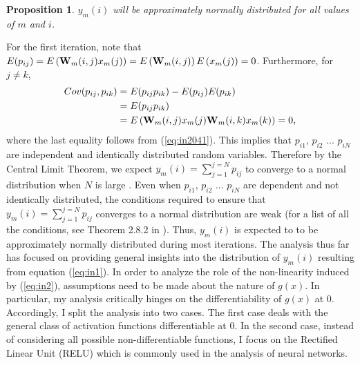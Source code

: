 \documentclass[a4paper]{article}
\newcommand{\eref}[1]{(\ref {eq:#1})}
\newcommand{\be}{\begin{equation}}
\newcommand{\ee}{\end{equation}}
\newtheorem{prop}{Proposition}
\begin{document}
\begin{prop}
$y_{m}(i)$ will be approximately normally distributed for all values of $m$ and $i$.
\end{prop}
\noindent
\noindent
For the first iteration, note that $E(p_{ij}) = E\left({\bf{W}}_{m}(i,j)x_{m}(j)\right) = E\left({\bf{W}}_{m}(i,j)\right)E\left(x_{m}(j)\right)  = 0$. Furthermore, for $j \neq k$,
\be 
\begin{split}
Cov(p_{ij},p_{ik})&= E(p_{ij}p_{ik}) - E(p_{ij})E(p_{ik}) \\
&=  E(p_{ij}p_{ik}) \\
&= E\left({\bf{W}}_{m}(i,j)x_{m}(j){\bf{W}}_{m}(i,k)x_{m}(k)\right) = 0,\\ 
\end{split}
\ee
where the last equality follows from \eref{in2041}. This implies that $p_{i1}$, $p_{i2}$ ... $p_{iN}$ are independent and identically distributed random variables. Therefore by the Central Limit Theorem, we expect $y_{m}(i) = \sum\limits_{j=1}^{j=N} p_{ij}$ to converge to a normal distribution when $N$ is large \cite{lehmann2004elements}.
Even when $p_{i1}$, $p_{i2}$ ... $p_{iN}$ are dependent and not identically distributed, the conditions required to ensure that  $y_{m}(i) = \sum\limits_{j=1}^{j=N} p_{ij}$ converges to a normal distribution are weak (for a list of all the conditions, see Theorem 2.8.2 in \cite{lehmann2004elements}). Thus,  $y_{m}(i)$ is expected to  to be approximately normally distributed  during most iterations.
\qedsymbol 
\linebreak
\newline
\noindent
The analysis thus far has focused on providing general insights into the distribution of ${y}_{m}(i)$ resulting from equation \eref{in1}. In order to analyze the role of the non-linearity induced by \eref{in2}, assumptions need to be made about the nature of $g(x)$. In particular, my analysis critically hinges on the differentiability of $g(x)$ at 0. Accordingly, I split the analysis into two cases. The first case deals with the general class of activation functions differentiable at 0. In the second case, instead of considering all possible non-differentiable functions, I focus on the Rectified Linear Unit (RELU) which is commonly used in the analysis of neural networks.
\end{document}
